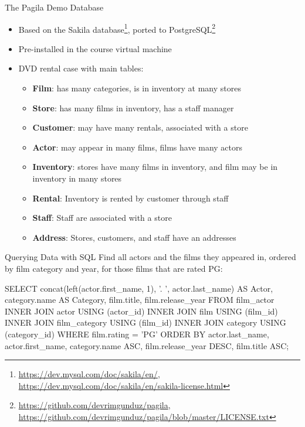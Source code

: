 \documentclass[ignorenonframetext,xcolor=x11names]{beamer}
\begin{document}
\begin{frame}{The Pagila Demo Database}

\begin{itemize}
  \item Based on the Sakila database\footnote{\scriptsize\url{https://dev.mysql.com/doc/sakila/en/}, 
\url{https://dev.mysql.com/doc/sakila/en/sakila-license.html}}, ported to PostgreSQL\footnote{\scriptsize\url{https://github.com/devrimgunduz/pagila},
\url{https://github.com/devrimgunduz/pagila/blob/master/LICENSE.txt}}
  \item Pre-installed in the course virtual machine
  \item DVD rental case with main tables:
  \begin{itemize}
	\item \textbf{Film}: has many categories, is in inventory at many stores
	\item \textbf{Store}: has many films in inventory, has a staff manager
	\item \textbf{Customer}: may have many rentals, associated with a store
	\item \textbf{Actor}: may appear in many films, films have many actors
	\item \textbf{Inventory}: stores have many films in inventory, and film may be in inventory in many stores
	\item \textbf{Rental}: Inventory is rented by customer through staff
	\item \textbf{Staff}: Staff are associated with a store
	\item \textbf{Address}: Stores, customers, and staff have an addresses
  \end{itemize}
\end{itemize}
\end{frame}

\begin{frame}[fragile]{Querying Data with SQL}
Find all actors and the films they appeared in, ordered by film category and year, for those films that are rated PG:
\footnotesize
\begin{sqlcode}
SELECT concat(left(actor.first_name, 1), 
              '. ', actor.last_name) AS Actor, 
       category.name AS Category, 
       film.title, 
       film.release_year
  FROM film_actor
  INNER JOIN actor USING (actor_id)
  INNER JOIN film USING (film_id)
  INNER JOIN film_category USING (film_id)
  INNER JOIN category USING (category_id)
  WHERE film.rating = 'PG'
  ORDER BY actor.last_name, 
           actor.first_name, 
           category.name ASC, 
           film.release_year DESC, 
           film.title ASC;
\end{sqlcode}
\end{frame}
\end{document}
